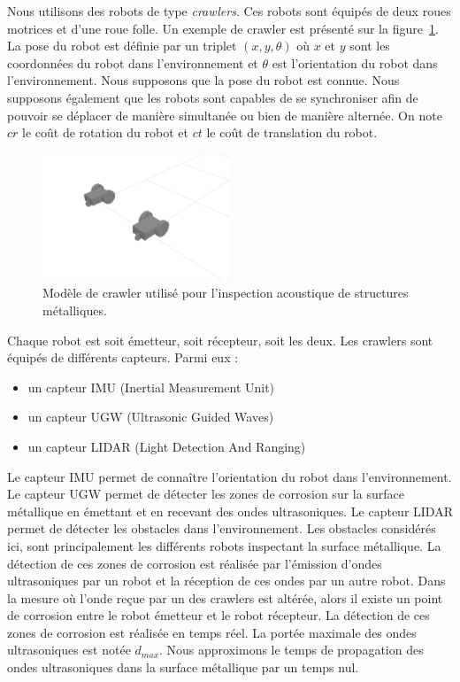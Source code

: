 \documentclass[francais,RandD]{rapportPFE}
\begin{document}
			Nous utilisons des robots de type \textit{crawlers}. Ces robots sont équipés de deux roues motrices et d'une roue folle.
			Un exemple de crawler est présenté sur la figure~\ref{fig:crawler}.
			La pose du robot est définie par un triplet $(x, y, \theta)$ où $x$ et $y$ sont les coordonnées du robot dans l'environnement et $\theta$ est l'orientation du robot dans l'environnement.
			Nous supposons que la pose du robot est connue.
			Nous supposons également que les robots sont capables de se synchroniser afin de pouvoir se déplacer de manière simultanée ou bien de manière alternée.
			On note $cr$ le coût de rotation du robot et $ct$ le coût de translation du robot.

			\begin{figure}[h!]
				\centering
				\includegraphics[width=0.5\textwidth]{graphics/crawlers.png}
				\caption{Modèle de crawler utilisé pour l'inspection acoustique de structures métalliques.}
				\label{fig:crawler}
			\end{figure}

			Chaque robot est soit émetteur, soit récepteur, soit les deux.
			Les crawlers sont équipés de différents capteurs.
			Parmi eux :
			\begin{itemize}
				\item un capteur IMU (Inertial Measurement Unit)
				\item un capteur UGW (Ultrasonic Guided Waves)
				\item un capteur LIDAR (Light Detection And Ranging)
			\end{itemize}
			Le capteur IMU permet de connaître l'orientation du robot dans l'environnement.
			Le capteur UGW permet de détecter les zones de corrosion sur la surface métallique en émettant et en recevant des ondes ultrasoniques.
			Le capteur LIDAR permet de détecter les obstacles dans l'environnement.
			Les obstacles considérés ici, sont principalement les différents robots inspectant la surface métallique.
			La détection de ces zones de corrosion est réalisée par l'émission d'ondes ultrasoniques par un robot et la réception de ces ondes par un autre robot.
			Dans la mesure où l'onde reçue par un des crawlers est altérée, alors il existe un point de corrosion entre le robot émetteur et le robot récepteur.
			La détection de ces zones de corrosion est réalisée en temps réel.
			La portée maximale des ondes ultrasoniques est notée $d_{max}$.
			Nous approximons le temps de propagation des ondes ultrasoniques dans la surface métallique par un temps nul.
\end{document}
